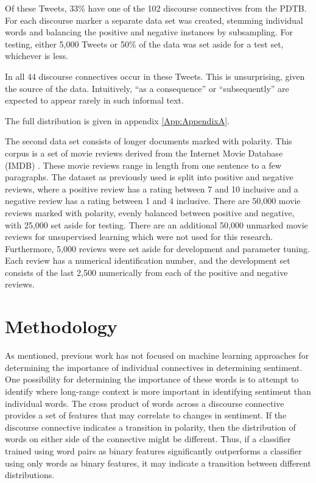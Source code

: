 \documentclass[11pt,letterpaper]{article}
\begin{document}
Of these Tweets, 33\% have one of the 102 discourse connectives from the PDTB.  For each discourse marker a separate data 
set was created, stemming individual words and balancing the positive and negative instances by subsampling.  For testing, either 5,000 Tweets or 50\% of
the data was set aside for a test set, whichever is less.

In all 44 discourse connectives occur in these Tweets. This is unsurprising, given the source of the data.
Intuitively, ``as a consequence'' or ``subsequently'' are expected to appear rarely in such informal text.

The full distribution is given in appendix \ref{App:AppendixA}. %

The second data set consists of longer documents marked with polarity.   This corpus is a set of movie reviews derived from the Internet Movie Database (IMDB) \cite{Maas}.  These
movie reviews range in length from one sentence to a few paragraphs.  The dataset as previously used is split into positive and 
negative reviews, where a positive review has a rating between 7 and 10 inclusive and a negative review has a rating between 1 and 4 inclusive.
There are 50,000 movie reviews marked with polarity, evenly balanced between positive and negative, with 25,000 set aside for testing.  There are an additional
50,000 unmarked movie reviews for unsupervised learning which were not used for this research.  Furthermore, 5,000 reviews were set aside for development and parameter tuning.
Each review has a numerical identification number, and the development set consists of the last 2,500 numerically from
each of the positive and negative reviews.

\section{Methodology}
As mentioned, previous work has not focused on machine learning approaches for determining the importance of individual connectives
in determining sentiment.  One possibility for determining the importance of these words is to attempt to identify where long-range
context is more important in identifying sentiment than individual words.  The cross product of words across a discourse connective
provides a set of features that may correlate to changes in sentiment.  If the discourse connective indicates a transition in
polarity, then the distribution of words on either side of the connective might be different.
Thus, if a classifier trained using word pairs as binary features significantly outperforms a classifier using only words as binary
features, it may indicate a transition between different distributions.
\end{document}
